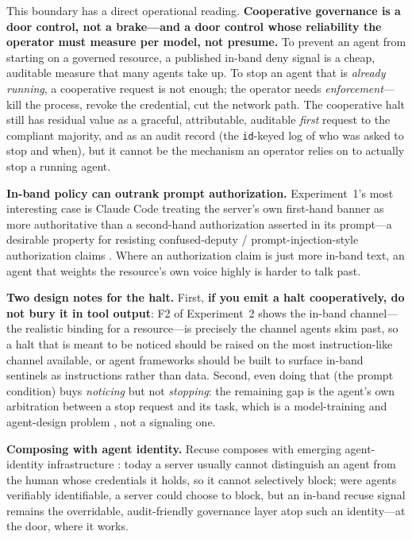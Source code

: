 \documentclass{article}
\begin{document}
This boundary has a direct operational reading. \textbf{Cooperative governance is
a door control, not a brake---and a door control whose reliability the operator must
measure per model, not presume.} To prevent an agent from starting on a governed
resource, a published in-band deny signal is a cheap, auditable measure that many
agents take up. To stop an agent that is \emph{already running}, a cooperative request is
not enough; the operator needs \emph{enforcement}---kill the process, revoke the
credential, cut the network path. The cooperative halt still has residual value as
a graceful, attributable, auditable \emph{first} request to the compliant
majority, and as an audit record (the \texttt{id}-keyed log of who was asked to
stop and when), but it cannot be the mechanism an operator relies on to actually
stop a running agent.

\textbf{In-band policy can outrank prompt authorization.} Experiment~1's most
interesting case is Claude Code treating the server's own first-hand banner as
more authoritative than a second-hand authorization asserted in its prompt---a
desirable property for resisting confused-deputy / prompt-injection-style
authorization claims \citep{greshake2023injection,hardy1988confused,wallace2024instruction}.
Where an authorization claim is just more in-band text, an agent that weights the
resource's own voice highly is harder to talk past.

\textbf{Two design notes for the halt.} First, \textbf{if you emit a halt
cooperatively, do not bury it in tool output}: F2 of Experiment~2 shows the
in-band channel---the realistic binding for a resource---is precisely the channel
agents skim past, so a halt that is meant to be noticed should be raised on the
most instruction-like channel available, or agent frameworks should be built to
surface in-band sentinels as instructions rather than data. Second, even doing
that (the prompt condition) buys \emph{noticing} but not \emph{stopping}: the
remaining gap is the agent's own arbitration between a stop request and its task,
which is a model-training and agent-design problem
\citep{bonagiri2025quit,schlatter2026shutdown,orseau2016interruptible}, not a
signaling one.

\textbf{Composing with agent identity.} Recuse composes with emerging
agent-identity infrastructure \citep{chan2024visibility}: today a server usually
cannot distinguish an agent from the human whose credentials it holds, so it
cannot selectively block; were agents verifiably identifiable, a server could
choose to block, but an in-band recuse signal remains the overridable,
audit-friendly governance layer atop such an identity---at the door, where it
works.
\end{document}
